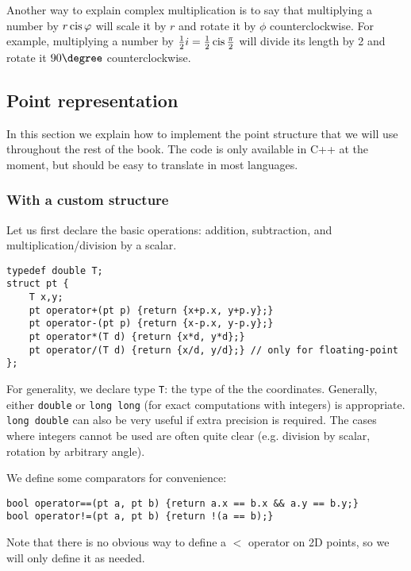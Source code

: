 Another way to explain complex multiplication is to say that multiplying a number by $r\operatorname{cis}\varphi$ will scale it by $r$ and rotate it by $\phi$ counterclockwise. For example, multiplying a number by $\frac{1}{2}i = \frac{1}{2}\operatorname{cis}\frac{\pi}{2}$ will divide its length by 2 and rotate it $90\degree$ counterclockwise.



\subsection{Point representation}\label{ss:point-representation}
In this section we explain how to implement the point structure that we will use throughout the rest of the book. The code is only available in C++ at the moment, but should be easy to translate in most languages.%

\subsubsection{With a custom structure}
Let us first declare the basic operations: addition, subtraction, and multiplication/division by a scalar.
\begin{lstlisting}
typedef double T;
struct pt {
    T x,y;
    pt operator+(pt p) {return {x+p.x, y+p.y};}
    pt operator-(pt p) {return {x-p.x, y-p.y};}
    pt operator*(T d) {return {x*d, y*d};}
    pt operator/(T d) {return {x/d, y/d};} // only for floating-point
};
\end{lstlisting}
For generality, we declare type \lstinline|T|: the type of the the coordinates. Generally, either \lstinline|double| or \lstinline|long long| (for exact computations with integers) is appropriate. \lstinline|long double| can also be very useful if extra precision is required. The cases where integers cannot be used are often quite clear (e.g. division by scalar, rotation by arbitrary angle).

We define some comparators for convenience:
\begin{lstlisting}
bool operator==(pt a, pt b) {return a.x == b.x && a.y == b.y;}
bool operator!=(pt a, pt b) {return !(a == b);}
\end{lstlisting}
Note that there is no obvious way to define a $<$ operator on 2D points, so we will only define it as needed.


